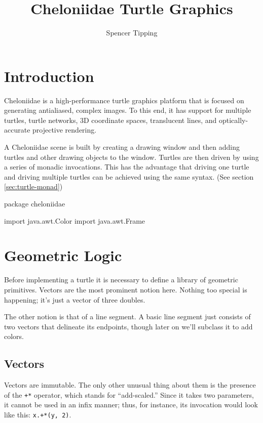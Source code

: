 \documentclass{article}
\title{Cheloniidae Turtle Graphics}
\author{Spencer Tipping}
\begin{document}
  \maketitle

  \tableofcontents

  \section{Introduction}
    \label{sec:introduction}

    Cheloniidae is a high-performance turtle graphics platform that is focused on generating antialiased, complex images. To this end, it has support for
    multiple turtles, turtle networks, 3D coordinate spaces, translucent lines, and optically-accurate projective rendering.

    A Cheloniidae scene is built by creating a drawing window and then adding turtles and other drawing objects to the window. Turtles are then driven by using
    a series of monadic invocations. This has the advantage that driving one turtle and driving multiple turtles can be achieved using the same syntax. (See
    section \ref{sec:turtle-monad})

    \begin{scalacode}
package cheloniidae

import java.awt.Color
import java.awt.Frame
    \end{scalacode}

  \section{Geometric Logic}
    \label{sec:geometric-logic}

    Before implementing a turtle it is necessary to define a library of geometric primitives. Vectors are the most prominent notion here. Nothing too special is
    happening; it's just a vector of three doubles.

    The other notion is that of a line segment. A basic line segment just consists of two vectors that delineate its endpoints, though later on we'll subclass
    it to add colors.

    \subsection{Vectors}
      \label{sec:vectors}

      Vectors are immutable. The only other unusual thing about them is the presence of the {\tt +*} operator, which stands for ``add-scaled.'' Since it takes
      two parameters, it cannot be used in an infix manner; thus, for instance, its invocation would look like this: {\tt x.+*(y, 2)}.
\end{document}
